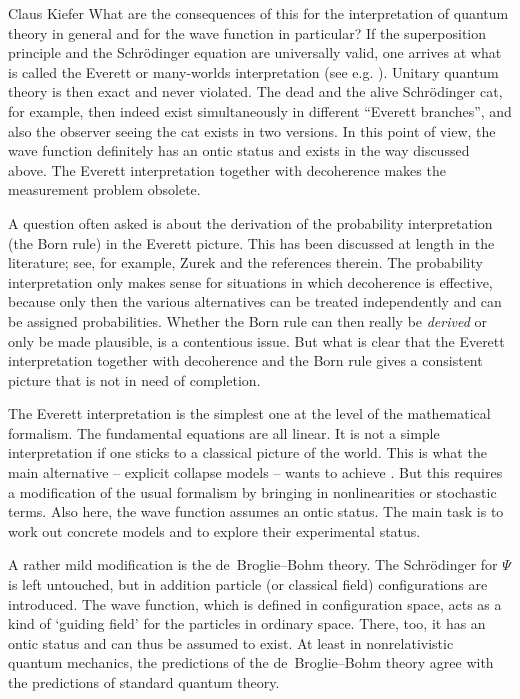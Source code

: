 \begin{artengenv}{Claus Kiefer}
What are the consequences of this for the interpretation of quantum
theory in general and for the wave function in particular?
If the superposition principle and the Schr\"odinger equation are
universally valid, one arrives at what is called the Everett or
many-worlds interpretation (see e.g. \cite{despagnat_veiled_1995,zeh_strange_2016}).
Unitary
quantum theory is then exact and never violated. The dead and the
alive Schr\"odinger cat, for example, then indeed exist simultaneously
in different ``Everett branches'', and also the observer seeing the
cat exists in two versions. In this point of view, the wave function
definitely has an ontic status and exists in the way discussed above.
The Everett interpretation together with decoherence makes the
measurement problem obsolete.

A question often asked is about the derivation of the probability
interpretation (the Born rule) in the Everett picture. This has been
discussed at length in the literature; see, for example, Zurek
\parencite*{zurek_wojciech_hubert_quantum_2018}
and the references therein. The probability interpretation only makes
sense for situations in which decoherence is effective, because only
then the various alternatives can be treated independently and can be
assigned probabilities. Whether the Born rule can then really be {\em
  derived} or only be made plausible, is a contentious issue. But what is
clear that the Everett interpretation together with decoherence and
the Born rule gives a consistent picture that is not in need
of completion. 

The Everett interpretation is the simplest one at the level of the
mathematical formalism. The fundamental equations are all linear. It
is not a simple interpretation if one sticks to a classical picture of
the world. This is what the main alternative -- explicit collapse
models -- wants to achieve \parencite[see e.g.][]{bassi_models_2013}. But this
requires a modification of the usual formalism by bringing in
nonlinearities or stochastic terms. Also here, the wave function
assumes an ontic status. The main task is to work out concrete models
and to explore their experimental status. 

A rather mild modification is the de~Broglie--Bohm
theory. The Schr\"odinger for $\Psi$ is left untouched, but
in addition particle (or classical field) configurations are
introduced. The wave function, which is defined in configuration space,
acts as a kind of `guiding field' for the particles in ordinary
space. There, too, it has an ontic status and can thus be assumed to
exist. At least in nonrelativistic quantum mechanics, the predictions
of the  de~Broglie--Bohm theory agree with the predictions of standard quantum
theory.


\end{artengenv}
